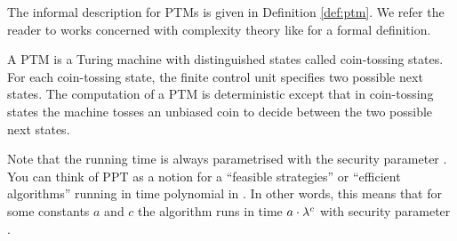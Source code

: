 \noindent
The informal description for \aclp{PTM} is given in Definition \ref{def:ptm}.
We refer the reader to works concerned with complexity theory like \cite{santos1969,WaterlooComplexity} for a formal definition.

\begin{definition}\label{def:ptm}
A \ac{PTM} is a Turing machine with distinguished states called coin-tossing states.
For each coin-tossing state, the finite control unit specifies two possible next states.
The computation of a \ac{PTM} is deterministic except that in coin-tossing states the machine tosses an unbiased coin to decide between the two possible next states.
\end{definition}

\noindent
Note that the running time is always parametrised with the security parameter \secpar.
You can think of \ac{PPT} as a notion for a ``feasible strategies'' or ``efficient algorithms'' running in time polynomial in \secpar.
In other words, this means that for some constants $a$ and $c$ the algorithm runs in time $a\cdot \lambda^c$ with security parameter \secpar \cite{katz2008introduction}.

